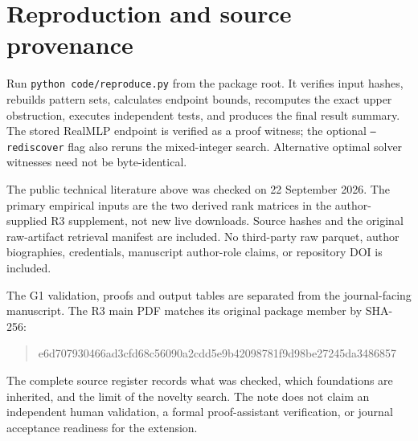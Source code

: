 \documentclass[11pt,a4paper]{article}
\begin{document}
\section*{Reproduction and source provenance}
Run \texttt{python code/reproduce.py} from the package root. It verifies input
hashes, rebuilds pattern sets, calculates endpoint bounds, recomputes the exact
upper obstruction, executes independent tests, and produces the final result
summary. The stored RealMLP endpoint is verified as a proof witness; the optional
\texttt{--rediscover} flag also reruns the mixed-integer search. Alternative
optimal solver witnesses need not be byte-identical.

The public technical literature above was checked on 22 September 2026. The
primary empirical inputs are the two derived rank matrices in the author-supplied
R3 supplement, not new live downloads. Source hashes and the original raw-artifact
retrieval manifest are included. No third-party raw parquet, author biographies,
credentials, manuscript author-role claims, or repository DOI is included.

The G1 validation, proofs and output tables are separated from the journal-facing
manuscript. The R3 main PDF matches its original package member by SHA-256:
\begin{quote}\small\ttfamily
 e6d707930466ad3cfd68c56090a2cdd5e9b42098781f9d98be27245da3486857
\end{quote}
The complete source register records what was checked, which foundations are
inherited, and the limit of the novelty search. The note does not claim an
independent human validation, a formal proof-assistant verification, or journal
acceptance readiness for the extension.
\end{document}
